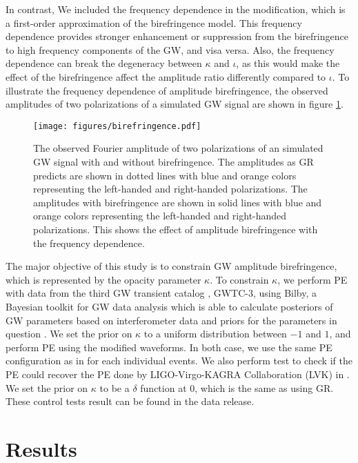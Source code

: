 \documentclass[aps,prd,twocolumn,superscriptaddress,preprintnumbers,floatfix,nofootinbib]{revtex4-2}
\begin{document}
In contrast, We included the frequency dependence in the modification, which is a first-order approximation of the birefringence model.
    This frequency dependence provides stronger enhancement or suppression from the birefringence to high frequency components of the GW, and visa versa.
Also, the frequency dependence can break the degeneracy between $\kappa$ and $\iota$, as this would make the effect of the birefringence affect the amplitude ratio differently compared to $\iota$.
To illustrate the frequency dependence of amplitude birefringence, the observed amplitudes of two polarizations of a simulated GW signal are shown in figure \ref{fig:birefringence}.

\begin{figure}[h]
    \texttt{[image: figures/birefringence.pdf]}
    \caption{
        The observed Fourier amplitude of two polarizations of an simulated GW signal with and without birefringence.
        The amplitudes as GR predicts are shown in dotted lines with blue and orange colors representing the left-handed and right-handed polarizations.
        The amplitudes with birefringence are shown in solid lines with blue and orange colors representing the left-handed and right-handed polarizations.
        This shows the effect of amplitude birefringence with the frequency dependence.
    }
    \label{fig:birefringence}
\end{figure}

The major objective of this study is to constrain GW amplitude birefringence, which is represented by the opacity parameter $\kappa$.
To constrain $\kappa$, we perform PE with data from the third GW transient catalog \citep{GWTC-2.1, GWTC-3}, GWTC-3, using Bilby, a Bayesian toolkit for GW data analysis which is able to calculate posteriors of GW parameters based on interferometer data and priors for the parameters in question \citep{Bilby}. 
We set the prior on $\kappa$ to a uniform distribution between $-1$ and $1$, and perform PE using the modified waveforms.
In both case, we use the same PE configuration as in \citet{GWTC-2.1, GWTC-3} for each individual events.
We also perform test to check if the PE could recover the PE done by LIGO-Virgo-KAGRA Collaboration (LVK) in \citet{GWTC-2.1, GWTC-3}.
We set the prior on $\kappa$ to be a $\delta$ function at $0$, which is the same as using GR.
These control tests result can be found in the data release.

\section{Results}
\label{sec:Results}
\end{document}

